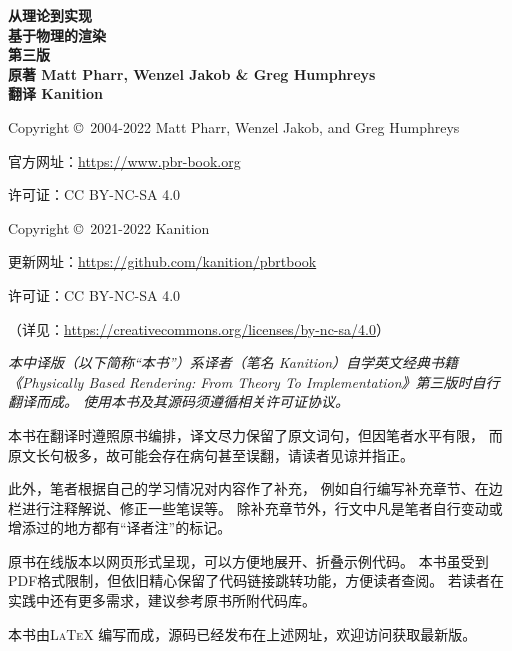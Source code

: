 \noindent \textbf{\LARGE 从理论到实现}\vspace{8pt}\\
\noindent \textbf{\Huge 基于物理的渲染}\vspace{8pt}\\
\noindent \textbf{\large 第三版}\vspace{8pt}\\
\noindent \textbf{\large 原著 \quad Matt Pharr, Wenzel Jakob \& Greg Humphreys}\vspace{5pt}\\
\noindent \textbf{\large 翻译 \quad Kanition}\vspace{16pt}\\


\noindent Copyright \copyright\ 2004-2022 Matt Pharr, Wenzel Jakob, and Greg Humphreys

\noindent 官方网址：\url{https://www.pbr-book.org}

\noindent 许可证：CC BY-NC-SA 4.0\\


\noindent Copyright \copyright\ 2021-2022 Kanition

\noindent 更新网址：\url{https://github.com/kanition/pbrtbook}

\noindent 许可证：CC BY-NC-SA 4.0

    {\small（详见：\url{https://creativecommons.org/licenses/by-nc-sa/4.0}）}

    {\ttfamily\small}

{\itshape
本中译版（以下简称“本书”）系译者（笔名 Kanition）自学英文经典书籍
《Physically Based Rendering: From Theory To Implementation》第三版时自行翻译而成。
使用本书及其源码须遵循相关许可证协议。

本书在翻译时遵照原书编排，译文尽力保留了原文词句，但因笔者水平有限，
而原文长句极多，故可能会存在病句甚至误翻，请读者见谅并指正。

此外，笔者根据自己的学习情况对内容作了补充，
例如自行编写补充章节、在边栏进行注释解说、修正一些笔误等。
除补充章节外，行文中凡是笔者自行变动或增添过的地方都有“译者注”的标记。

原书在线版本以网页形式呈现，可以方便地展开、折叠示例代码。
本书虽受到PDF格式限制，但依旧精心保留了代码链接跳转功能，方便读者查阅。
若读者在实践中还有更多需求，建议参考原书所附代码库。

本书由{\scshape \LaTeX} 编写而成，源码已经发布在上述网址，欢迎访问获取最新版。

{\color{red}}
}
